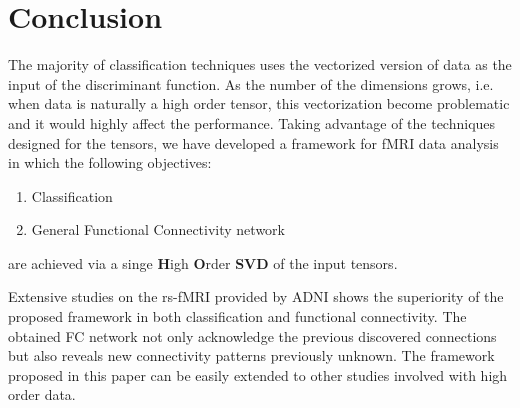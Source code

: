 \documentclass[journal]{IEEEtran}
\begin{document}
	
	
	
	
	
	
	
	
	
	
	
	
	
	
	
	
	
	\section{Conclusion}
	The majority of classification techniques uses the vectorized version of data as the input of the discriminant function. As the number of the dimensions grows, i.e. when data is naturally a high order tensor, this vectorization become problematic and it would highly affect the  performance. Taking advantage of the techniques designed for the tensors, we have developed a framework for fMRI data analysis in which the following objectives: 
	\begin{enumerate}
		\item 
		Classification 
		\item 
		General Functional Connectivity network
	\end{enumerate}
	are achieved via a singe \textbf{H}igh \textbf{O}rder \textbf{SVD} of the input tensors. 
	
	Extensive studies on the rs-fMRI provided by ADNI shows the superiority of the proposed framework in both classification and functional connectivity. The obtained FC network not only acknowledge the previous discovered connections but also reveals new connectivity patterns previously unknown.
	The framework proposed in this paper can be easily extended to other studies involved with high order data.  
	
\end{document}
